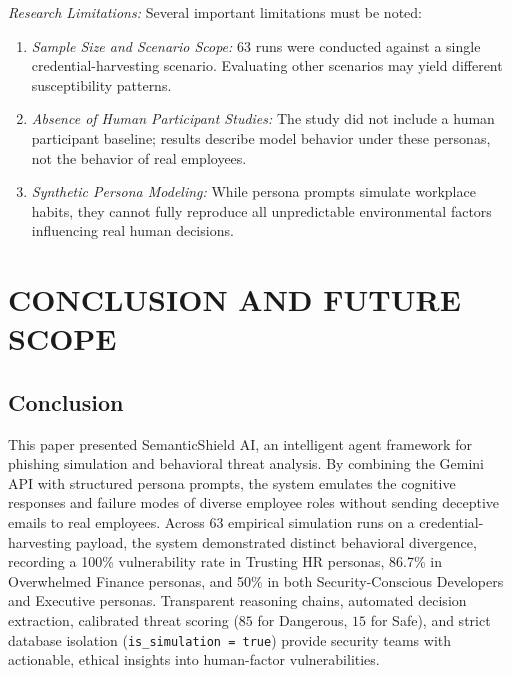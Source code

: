 \documentclass[conference,letterpaper]{IEEEtran}
\begin{document}
\textit{Research Limitations:} Several important limitations must be noted:
\begin{enumerate}
    \item \textit{Sample Size and Scenario Scope:} 63 runs were conducted against a single credential-harvesting scenario. Evaluating other scenarios may yield different susceptibility patterns.
    \item \textit{Absence of Human Participant Studies:} The study did not include a human participant baseline; results describe model behavior under these personas, not the behavior of real employees.
    \item \textit{Synthetic Persona Modeling:} While persona prompts simulate workplace habits, they cannot fully reproduce all unpredictable environmental factors influencing real human decisions.
\end{enumerate}

\section{CONCLUSION AND FUTURE SCOPE}

\subsection{Conclusion}
This paper presented SemanticShield AI, an intelligent agent framework for phishing simulation and behavioral threat analysis. By combining the Gemini API with structured persona prompts, the system emulates the cognitive responses and failure modes of diverse employee roles without sending deceptive emails to real employees. Across 63 empirical simulation runs on a credential-harvesting payload, the system demonstrated distinct behavioral divergence, recording a 100\% vulnerability rate in Trusting HR personas, 86.7\% in Overwhelmed Finance personas, and 50\% in both Security-Conscious Developers and Executive personas. Transparent reasoning chains, automated decision extraction, calibrated threat scoring ($85$ for Dangerous, $15$ for Safe), and strict database isolation (\texttt{is\_simulation = true}) provide security teams with actionable, ethical insights into human-factor vulnerabilities.
\end{document}
